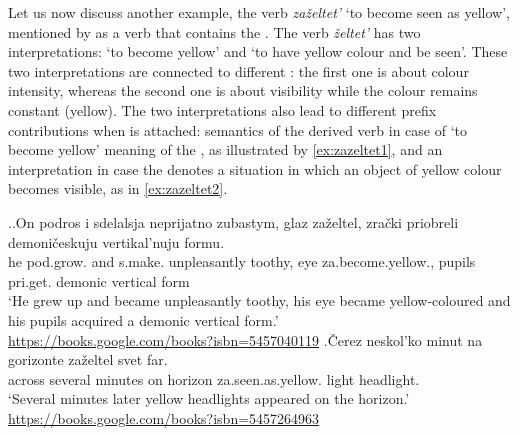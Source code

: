 Let us now discuss another example, the verb \textit{za\v{z}eltet'} `to become seen as yellow', mentioned by \citet{Braginsky:08} as a verb that contains the  {.} The verb \textit{\v{z}eltet'} has two interpretations: `to become yellow' and `to have yellow colour and be seen'. These two interpretations are connected to different  : the first one is about colour intensity, whereas the second one is about visibility while the colour remains constant (yellow). The two interpretations also lead to different prefix contributions when  is attached:  semantics of the derived verb in case of `to become yellow' meaning of the , as illustrated by \ref{ex:zazeltet1}, and an  interpretation in case the  denotes a  situation in which an object of yellow colour becomes visible, as in \ref{ex:zazeltet2}.


\ex.\label{ex:zazeltet}\ag.\label{ex:zazeltet1}On podros i sdelalsja neprijatno zubastym, glaz za\v{z}eltel, zra\v{c}ki priobreli demoni\v{c}eskuju vertikal'nuju formu.\\
he pod.grow. and s.make. unpleasantly toothy, eye za.become.yellow., pupils pri.get. demonic vertical form\\
`He grew up and became unpleasantly toothy, his eye became yellow-coloured and his pupils acquired a demonic vertical form.'\\\hbox{}\hfill\hbox{\url{https://books.google.com/books?isbn=5457040119}}
\bg.\label{ex:zazeltet2}\v{C}erez neskol'ko minut na gorizonte za\v{z}eltel svet far.\\
across several minutes on horizon za.seen.as.yellow. light headlight.\\
`Several minutes later yellow headlights appeared on the horizon.'\\\hbox{}\hfill\hbox{\url{https://books.google.com/books?isbn=5457264963}}

